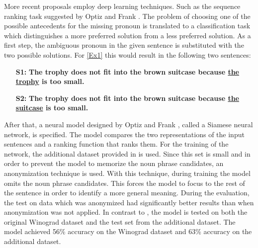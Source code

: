 More recent proposals employ deep learning techniques. Such as the sequence ranking task suggested by Optiz and Frank \cite{W18-4105}. The problem of choosing one of the possible antecedents for the missing pronoun is translated to a classification task which distinguishes a more preferred solution from a less preferred solution. As a first step, the ambiguous pronoun in the given sentence is substituted with the two possible solutions.  
For \ref{Ex1} this would result in the following two sentences: 

\begin{itemize}
	\item [\textbf{S1:}] \textbf{The trophy does not fit into the brown suitcase because \underline{the trophy} is too small.}
	\item[\textbf{S2:}] \textbf{The trophy does not fit into the brown suitcase because \underline{the suitcase} is too small.}
\end{itemize} 

After that, a neural model designed by Optiz and Frank \cite{W18-4105}, called a Siamese neural network, is specified. The model compares the two representations of the input sentences and a ranking function that ranks them. 
For the training of the network, the additional dataset provided in \cite{DBLP:conf/emnlp/RahmanN12} is used. Since this set is small and in order to prevent the model to memorize the noun phrase candidates, an anonymization technique is used. With this technique, during training the model omits the noun phrase candidates. This forces the model to focus to the rest of the sentence in order to identify a more general meaning. During the evaluation, the test on data which was anonymized had significantly better results than when anonymization was not applied. In contrast to \cite{DBLP:conf/emnlp/RahmanN12}, the model is tested on both the original Winograd dataset and the test set from the additional dataset. The model achieved 56\% accuracy on the Winograd dataset and 63\% accuracy on the additional dataset.


